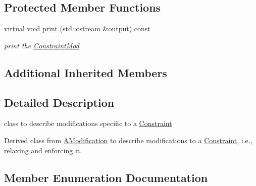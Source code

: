 \subsection*{Protected Member Functions}
\begin{DoxyCompactItemize}
\item 
\mbox{\label{class_s_m_spp__di__unipi__it_1_1_constraint_mod_a2e7b9c9148a98c5c342e8c25cac95926}} 
virtual void \mbox{\hyperlink{class_s_m_spp__di__unipi__it_1_1_constraint_mod_a2e7b9c9148a98c5c342e8c25cac95926}{print}} (std\+::ostream \&output) const
\begin{DoxyCompactList}\small\item\em print the \mbox{\hyperlink{class_s_m_spp__di__unipi__it_1_1_constraint_mod}{Constraint\+Mod}} \end{DoxyCompactList}\end{DoxyCompactItemize}
\subsection*{Additional Inherited Members}


\subsection{Detailed Description}
class to describe modifications specific to a \mbox{\hyperlink{class_s_m_spp__di__unipi__it_1_1_constraint}{Constraint}} 

Derived class from \mbox{\hyperlink{class_s_m_spp__di__unipi__it_1_1_a_modification}{A\+Modification}} to describe modifications to a \mbox{\hyperlink{class_s_m_spp__di__unipi__it_1_1_constraint}{Constraint}}, i.\+e., relaxing and enforcing it. 

\subsection{Member Enumeration Documentation}
\mbox{\label{class_s_m_spp__di__unipi__it_1_1_constraint_mod_a083683af0e6943bd7a3261e9037fd149}} 
